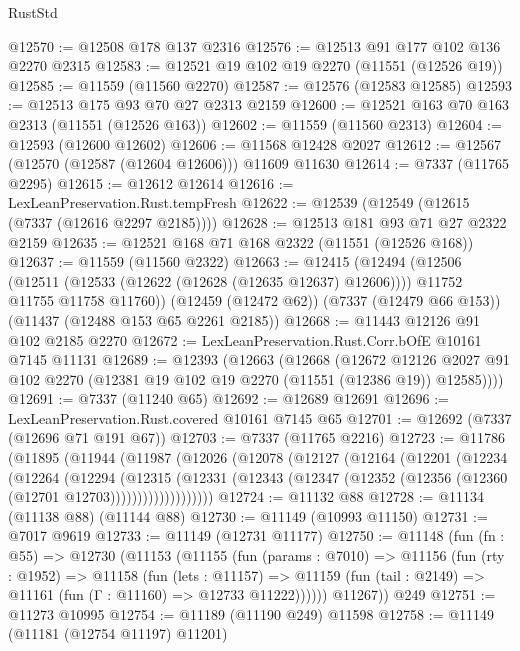 \begin{lexlean}{RustStd}
\begin{coremodule}
@12570 := @12508 @178 @137 @2316
@12576 := @12513 @91 @177 @102 @136 @2270 @2315
@12583 := @12521 @19 @102 @19 @2270 (@11551 (@12526 @19))
@12585 := @11559 (@11560 @2270)
@12587 := @12576 (@12583 @12585)
@12593 := @12513 @175 @93 @70 @27 @2313 @2159
@12600 := @12521 @163 @70 @163 @2313 (@11551 (@12526 @163))
@12602 := @11559 (@11560 @2313)
@12604 := @12593 (@12600 @12602)
@12606 := @11568 @12428 @2027
@12612 := @12567 (@12570 (@12587 (@12604 @12606))) @11609 @11630
@12614 := @7337 (@11765 @2295)
@12615 := @12612 @12614
@12616 := LexLeanPreservation.Rust.tempFresh
@12622 := @12539 (@12549 (@12615 (@7337 (@12616 @2297 @2185))))
@12628 := @12513 @181 @93 @71 @27 @2322 @2159
@12635 := @12521 @168 @71 @168 @2322 (@11551 (@12526 @168))
@12637 := @11559 (@11560 @2322)
@12663 := @12415
    (@12494
      (@12506
        (@12511 (@12533 (@12622 (@12628 (@12635 @12637) @12606))))
        @11752
        @11755
        @11758
        @11760))
    (@12459 (@12472 @62))
    (@7337 (@12479 @66 @153))
    (@11437 (@12488 @153 @65 @2261 @2185))
@12668 := @11443 @12126 @91 @102 @2185 @2270
@12672 := LexLeanPreservation.Rust.Corr.bOfE @10161 @7145 @11131
@12689 := @12393
    (@12663
      (@12668
        (@12672
          @12126
          @2027
          @91
          @102
          @2270
          (@12381 @19 @102 @19 @2270 (@11551 (@12386 @19)) @12585))))
@12691 := @7337 (@11240 @65)
@12692 := @12689 @12691
@12696 := LexLeanPreservation.Rust.covered @10161 @7145 @65
@12701 := @12692 (@7337 (@12696 @71 @191 @67))
@12703 := @7337 (@11765 @2216)
@12723 := @11786
    (@11895
      (@11944
        (@11987
          (@12026
            (@12078
              (@12127
                (@12164
                  (@12201
                    (@12234
                      (@12264
                        (@12294
                          (@12315
                            (@12331
                              (@12343
                                (@12347 (@12352 (@12356 (@12360 (@12701 @12703)))))))))))))))))))
@12724 := @11132 @88
@12728 := @11134 (@11138 @88) (@11144 @88)
@12730 := @11149 (@10993 @11150)
@12731 := @7017 @9619
@12733 := @11149 (@12731 @11177)
@12750 := @11148
    (fun (fn : @55) =>
    @12730
      (@11153
        (@11155
          (fun (params : @7010) =>
          @11156
            (fun (rty : @1952) =>
            @11158
              (fun (lets : @11157) =>
              @11159 (fun (tail : @2149) => @11161 (fun (Γ : @11160) => @12733 @11222))))))
        @11267))
    @249
@12751 := @11273 @10995
@12754 := @11189 (@11190 @249) @11598
@12758 := @11149 (@11181 (@12754 @11197) @11201)

\end{coremodule}
\end{lexlean}
